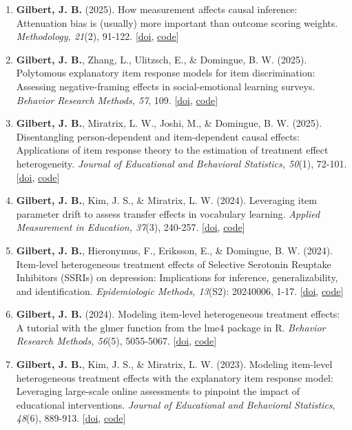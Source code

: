 \documentclass[11pt]{article}
\begin{document}
\begin{enumerate}
\item \textbf{Gilbert, J. B.} (2025). How measurement affects causal inference: Attenuation bias is (usually) more important than outcome scoring weights. \textit{Methodology, 21}(2), 91-122. [\href{https://doi.org/10.5964/meth.15773}{doi}, \href{https://researchbox.org/2289}{code}]
\item \textbf{Gilbert, J. B.}, Zhang, L., Ulitzsch, E., \& Domingue, B. W. (2025). Polytomous explanatory item response models for item discrimination: Assessing negative-framing effects in social-emotional learning surveys. \textit{Behavior Research Methods, 57}, 109. [\href{https://doi.org/10.3758/s13428-025-02625-2}{doi}, \href{https://researchbox.org/3008}{code}]
\item \textbf{Gilbert, J. B.}, Miratrix, L. W., Joshi, M., \& Domingue, B. W. (2025). Disentangling person-dependent and item-dependent causal effects: Applications of item response theory to the estimation of treatment effect heterogeneity. \textit{Journal of Educational and Behavioral Statistics, 50}(1), 72-101. [\href{https://doi.org/10.3102/10769986241240085}{doi}, \href{https://researchbox.org/2221}{code}] \label{jebs_disentangle}
\item \textbf{Gilbert, J. B.}, Kim, J. S., \& Miratrix, L. W. (2024). Leveraging item parameter drift to assess transfer effects in vocabulary learning. \textit{Applied Measurement in Education, 37}(3), 240-257. [\href{https://doi.org/10.1080/08957347.2024.2386934}{doi}, \href{https://doi.org/10.7910/DVN/ZF1LKZ}{code}]
\item  \textbf{Gilbert, J. B.}, Hieronymus, F., Eriksson, E., \& Domingue, B. W. (2024). Item-level heterogeneous treatment effects of Selective Serotonin Reuptake Inhibitors (SSRIs) on depression: Implications for inference, generalizability, and identification. \textit{Epidemiologic Methods, 13}(S2): 20240006, 1-17. [\href{https://doi.org/10.1515/em-2024-0006}{doi}, \href{https://researchbox.org/2494}{code}] \label{ssri}
\item \textbf{Gilbert, J. B.} (2024). Modeling item-level heterogeneous treatment effects: A tutorial with the glmer function from the lme4 package in R. \textit{Behavior Research Methods, 56}(5), 5055-5067. [\href{https://link.springer.com/article/10.3758/s13428-023-02245-8}{doi}, \href{https://researchbox.org/2054}{code}] \label{brm_tutorial}
\item \textbf{Gilbert, J. B.}, Kim, J. S., \& Miratrix, L. W. (2023). Modeling item-level heterogeneous treatment effects with the explanatory item response model: Leveraging large-scale online assessments to pinpoint the impact of educational interventions. \textit{Journal of Educational and Behavioral Statistics}, \textit{48}(6), 889-913. [\href{https://journals.sagepub.com/doi/pdf/10.3102/10769986231171710?casa_token=x3jNXUGSOLcAAAAA:zaf5NeBKTwW6o0bXHueUS4Tak0FzZDBJVcDXUAE8txGAUDeCRyNhOhqsPLQb-q220kcrwRsOz2WS}{doi}, \href{https://dataverse.harvard.edu/dataset.xhtml?persistentId=doi:10.7910/DVN/QARRYT}{code}] \label{jebs_ilhte}


\end{enumerate}
\end{document}

